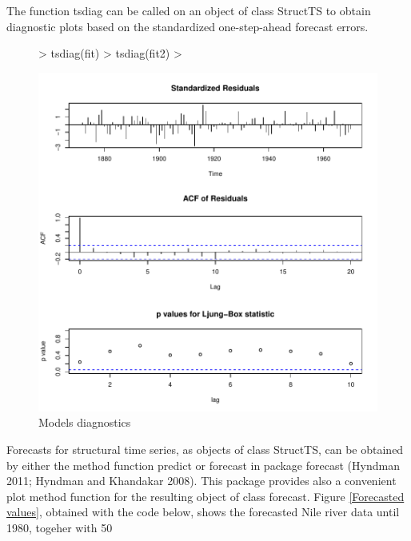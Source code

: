 \documentclass[11pt, a4paper]{article} %
\begin{document}
\noindent The function tsdiag can be called on an object of class StructTS to obtain diagnostic plots based on the standardized one-step-ahead forecast errors.
\begin{figure}
\centering
\begin{Schunk}
\begin{Sinput}
> tsdiag(fit)
> tsdiag(fit2)
> 
\end{Sinput}
\end{Schunk}
\includegraphics{alles-056}
\caption{Models diagnostics}
\end{figure}

\noindent Forecasts for structural time series, as objects of class StructTS, can be obtained by either the method function predict or forecast in package forecast (Hyndman 2011; Hyndman and Khandakar 2008). This package provides also a convenient plot method function for the resulting object of class forecast. Figure \ref{Forecasted values}, obtained with the code below, shows the forecasted Nile river data until 1980, togeher with 50%
\end{document}
